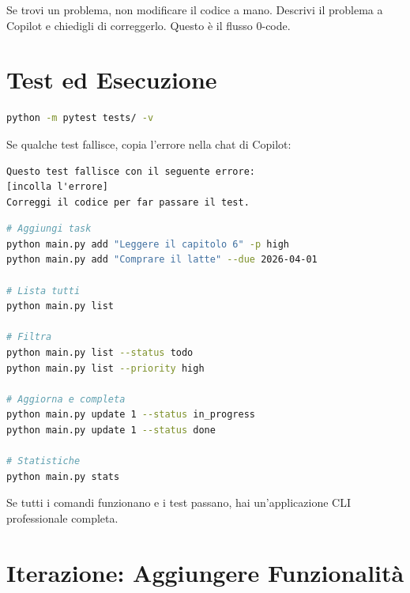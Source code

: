 \begin{warnbox}
Se trovi un problema, non modificare il codice a mano. Descrivi il problema a Copilot e chiedigli di correggerlo. Questo è il flusso 0-code.
\end{warnbox}

\section{Test ed Esecuzione}

\begin{praticabox}[title={Pratica --- Test}]
\begin{lstlisting}[language=bash]
python -m pytest tests/ -v
\end{lstlisting}
Se qualche test fallisce, copia l'errore nella chat di Copilot:
\begin{lstlisting}[language={}]
Questo test fallisce con il seguente errore:
[incolla l'errore]
Correggi il codice per far passare il test.
\end{lstlisting}
\end{praticabox}

\begin{praticabox}[title={Pratica --- Uso dell'applicazione}]
\begin{lstlisting}[language=bash]
# Aggiungi task
python main.py add "Leggere il capitolo 6" -p high
python main.py add "Comprare il latte" --due 2026-04-01

# Lista tutti
python main.py list

# Filtra
python main.py list --status todo
python main.py list --priority high

# Aggiorna e completa
python main.py update 1 --status in_progress
python main.py update 1 --status done

# Statistiche
python main.py stats
\end{lstlisting}
\end{praticabox}

\begin{checkpointbox}
Se tutti i comandi funzionano e i test passano, hai un'applicazione CLI professionale completa.
\end{checkpointbox}

\section{Iterazione: Aggiungere Funzionalità}

